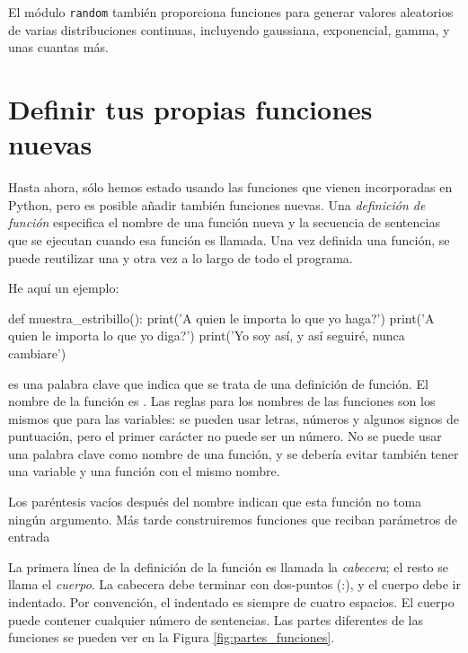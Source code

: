El módulo \texttt{random} también proporciona funciones para generar
valores aleatorios de varias distribuciones continuas, incluyendo
gaussiana, exponencial, gamma, y unas cuantas más.

\hypertarget{auxf1adiendo-funciones-nuevas}{%
\section{Definir tus propias funciones
nuevas}\label{auxf1adiendo-funciones-nuevas}}

Hasta ahora, sólo hemos estado usando las funciones que vienen
incorporadas en Python, pero es posible añadir también funciones nuevas.
Una \emph{definición de función} especifica el nombre de una función
nueva y la secuencia de sentencias que se ejecutan cuando esa función es
llamada. Una vez definida una función, se puede reutilizar una y otra
vez a lo largo de todo el programa.

  

He aquí un ejemplo:

\begin{python}[frame=single]
def muestra_estribillo():
    print('A quien le importa lo que yo haga?')
    print('A quien le importa lo que yo diga?')
    print('Yo soy así, y así seguiré, nunca cambiare')
\end{python}

 es una palabra clave que indica que se trata de una
definición de función. El nombre de la función es
. Las reglas para los nombres de las
funciones son los mismos que para las variables: se pueden usar letras,
números y algunos signos de puntuación, pero el primer carácter no puede
ser un número. No se puede usar una palabra clave como nombre de una
función, y se debería evitar también tener una variable y una función
con el mismo nombre.

  

Los paréntesis vacíos después del nombre indican que esta función no
toma ningún argumento. Más tarde construiremos funciones que reciban
parámetros de entrada

  
 

La primera línea de la definición de la función es llamada la
\emph{cabecera}; el resto se llama el \emph{cuerpo}. La cabecera debe
terminar con dos-puntos (:), y el cuerpo debe ir indentado. Por
convención, el indentado es siempre de cuatro espacios. El cuerpo puede
contener cualquier número de sentencias. Las partes diferentes de las funciones se pueden ver en la Figura \ref{fig:partes_funciones}.

